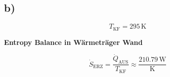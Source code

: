 

\subsection*{b)}
\[
T_{\text{KF}} = 295 \, \text{K}
\]

\textbf{Entropy Balance in Wärmeträger Wand}

\[
\dot{S}_{\text{ERZ}} = \frac{\dot{Q}_{\text{AUS}}}{T_{\text{KF}}} \approx \frac{210.79 \, \text{W}}{\text{K}}
\]
